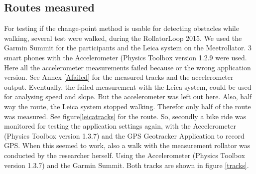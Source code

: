
\subsection{Routes measured}
For testing if the change-point method is usable for detecting obstacles while walking, several test were walked, during the RollatorLoop 2015.
We used the Garmin Summit for the participants and the Leica system on the Meetrollator. 3 smart phones with the Accelerometer (Physics Toolbox version 1.2.9 were used. Here all the accelerometer measurements failed because or the wrong application version.  See Annex \ref{Afailed} for the measured tracks and the accelerometer output. Eventually, the failed measurement with the Leica system, could be used for analysing speed and slope. But the accelerometer was left out here. Also, half way the route, the Leica system stopped walking. Therefor only half of the route was measured. See figure\ref{leicatracks} for the route.
So, secondly a bike ride was monitored for testing the application settings again, with the Accelerometer (Physics Toolbox version 1.3.7) and the GPS Geotracker Application to record GPS. When this seemed to work, also a walk with the measurement rollator was conducted by the researcher herself. Using the Accelerometer (Physics Toolbox version 1.3.7) and the Garmin Summit. Both tracks are shown in figure \ref{tracks}.

